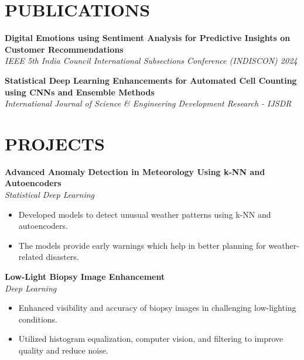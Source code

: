 \documentclass[a4paper,11pt]{article}
\newcommand{\safehref}[2]{#2}
\let\href\safehref
\newcommand{\extlink}{\raisebox{0.2ex}{\scriptsize\faExternalLink*}}
\begin{document}
\section*{PUBLICATIONS}
\sloppy
\noindent\textbf{\href{https://example.com}{Digital Emotions using Sentiment Analysis for Predictive Insights on Customer Recommendations\ \extlink}}\\
\textit{IEEE 5th India Council International Subsections Conference (INDISCON) 2024}

\vspace{0.2cm}
\noindent\textbf{\href{https://example.com}{Statistical Deep Learning Enhancements for Automated Cell Counting using CNNs and Ensemble Methods\ \extlink}}\\
\textit{International Journal of Science \& Engineering Development Research - IJSDR}
\fussy

\section*{PROJECTS}
\sloppy
\noindent\textbf{\href{https://example.com}{Advanced Anomaly Detection in Meteorology Using k-NN and Autoencoders\ \extlink}}\\
\textit{Statistical Deep Learning}
\begin{itemize}
  \item Developed models to detect unusual weather patterns using k-NN and autoencoders.
  \item The models provide early warnings which help in better planning for weather-related disasters.
\end{itemize}

\vspace{0.15cm}
\noindent\textbf{\href{https://example.com}{Low-Light Biopsy Image Enhancement\ \extlink}}\\
\textit{Deep Learning}
\begin{itemize}
  \item Enhanced visibility and accuracy of biopsy images in challenging low-lighting conditions.
  \item Utilized histogram equalization, computer vision, and filtering to improve quality and reduce noise.
\end{itemize}
\fussy
\end{document}
